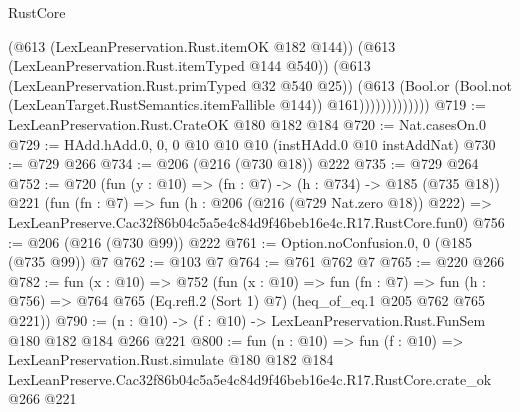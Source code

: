 \begin{lexlean}{RustCore}
\begin{coremodule}
                          (@613 (LexLeanPreservation.Rust.itemOK @182 @144))
                          (@613 (LexLeanPreservation.Rust.itemTyped @144 @540))
                          (@613 (LexLeanPreservation.Rust.primTyped @32 @540 @25))
                          (@613
                            (Bool.or
                              (Bool.not (LexLeanTarget.RustSemantics.itemFallible @144))
                              @161)))))))))))))
@719 := LexLeanPreservation.Rust.CrateOK @180 @182 @184
@720 := Nat.casesOn.{0}
@729 := HAdd.hAdd.{0, 0, 0} @10 @10 @10 (instHAdd.{0} @10 instAddNat)
@730 := @729 @266
@734 := @206 (@216 (@730 @18)) @222
@735 := @729 @264
@752 := @720
    (fun (y : @10) => (fn : @7) -> (h : @734) -> @185 (@735 @18))
    @221
    (fun (fn : @7) =>
    fun (h : @206 (@216 (@729 Nat.zero @18)) @222) =>
    LexLeanPreserve.Cac32f86b04c5a5e4c84d9f46beb16e4c.R17.RustCore.fun0)
@756 := @206 (@216 (@730 @99)) @222
@761 := Option.noConfusion.{0, 0} (@185 (@735 @99)) @7
@762 := @103 @7
@764 := @761 @762 @7
@765 := @220 @266
@782 := fun (x : @10) =>
  @752
    (fun (x : @10) =>
    fun (fn : @7) =>
    fun (h : @756) => @764 @765 (Eq.refl.{2} (Sort 1) @7) (heq_of_eq.{1} @205 @762 @765 @221))
@790 := (n : @10) -> (f : @10) -> LexLeanPreservation.Rust.FunSem @180 @182 @184 @266 @221
@800 := fun (n : @10) =>
  fun (f : @10) =>
  LexLeanPreservation.Rust.simulate
    @180
    @182
    @184
    LexLeanPreserve.Cac32f86b04c5a5e4c84d9f46beb16e4c.R17.RustCore.crate_ok
    @266
    @221
\end{coremodule}
\end{lexlean}
